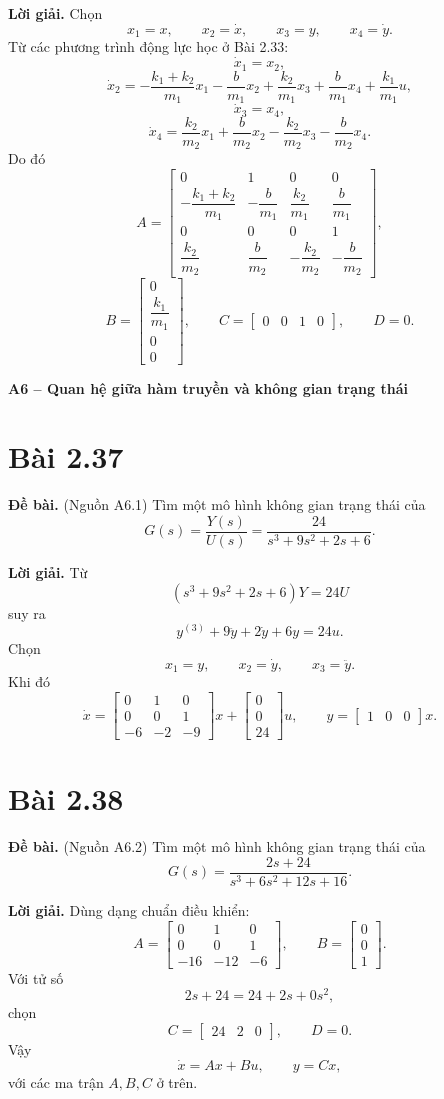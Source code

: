 \documentclass[11pt,a4paper]{article}
\newcommand{\baitap}[1]{%
  \Needspace{4\baselineskip}%
  \section*{Bài #1}%
}
\newcommand{\debai}{\par\noindent\textbf{Đề bài.}\enspace}
\newcommand{\loigiai}{\par\smallskip\noindent\textbf{Lời giải.}\enspace}
\begin{document}
\loigiai
Chọn
\[
x_1=x,\qquad
x_2=\dot x,\qquad
x_3=y,\qquad
x_4=\dot y.
\]
Từ các phương trình động lực học ở Bài 2.33:
\[
\dot x_1=x_2,
\]
\[
\dot x_2
=
-\frac{k_1+k_2}{m_1}x_1
-\frac b{m_1}x_2
+\frac{k_2}{m_1}x_3
+\frac b{m_1}x_4
+\frac{k_1}{m_1}u,
\]
\[
\dot x_3=x_4,
\]
\[
\dot x_4
=
\frac{k_2}{m_2}x_1
+\frac b{m_2}x_2
-\frac{k_2}{m_2}x_3
-\frac b{m_2}x_4.
\]
Do đó
\[
\boxed{
A=
\begin{bmatrix}
0&1&0&0\\
-\dfrac{k_1+k_2}{m_1}&-\dfrac b{m_1}&\dfrac{k_2}{m_1}&\dfrac b{m_1}\\
0&0&0&1\\
\dfrac{k_2}{m_2}&\dfrac b{m_2}&-\dfrac{k_2}{m_2}&-\dfrac b{m_2}
\end{bmatrix},
}
\]
\[
\boxed{
B=
\begin{bmatrix}
0\\[1mm]\dfrac{k_1}{m_1}\\[1mm]0\\[1mm]0
\end{bmatrix},
\qquad
C=
\begin{bmatrix}
0&0&1&0
\end{bmatrix},
\qquad D=0.
}
\]

\textbf{A6 -- Quan hệ giữa hàm truyền và không gian trạng thái}

\baitap{2.37}
\debai
(Nguồn A6.1) Tìm một mô hình không gian trạng thái của
\[
G(s)=\frac{Y(s)}{U(s)}
=
\frac{24}{s^3+9s^2+2s+6}.
\]

\loigiai
Từ
\[
(s^3+9s^2+2s+6)Y=24U
\]
suy ra
\[
y^{(3)}+9\ddot y+2\dot y+6y=24u.
\]
Chọn
\[
x_1=y,\qquad x_2=\dot y,\qquad x_3=\ddot y.
\]
Khi đó
\[
\boxed{
\dot x=
\begin{bmatrix}
0&1&0\\
0&0&1\\
-6&-2&-9
\end{bmatrix}x
+
\begin{bmatrix}
0\\0\\24
\end{bmatrix}u,
\qquad
y=
\begin{bmatrix}
1&0&0
\end{bmatrix}x.
}
\]

\baitap{2.38}
\debai
(Nguồn A6.2) Tìm một mô hình không gian trạng thái của
\[
G(s)=
\frac{2s+24}{s^3+6s^2+12s+16}.
\]

\loigiai
Dùng dạng chuẩn điều khiển:
\[
A=
\begin{bmatrix}
0&1&0\\
0&0&1\\
-16&-12&-6
\end{bmatrix},
\qquad
B=
\begin{bmatrix}
0\\0\\1
\end{bmatrix}.
\]
Với tử số
\[
2s+24=24+2s+0s^2,
\]
chọn
\[
C=
\begin{bmatrix}
24&2&0
\end{bmatrix},
\qquad D=0.
\]
Vậy
\[
\boxed{
\dot x=Ax+Bu,\qquad y=Cx,
}
\]
với các ma trận \(A,B,C\) ở trên.
\end{document}
